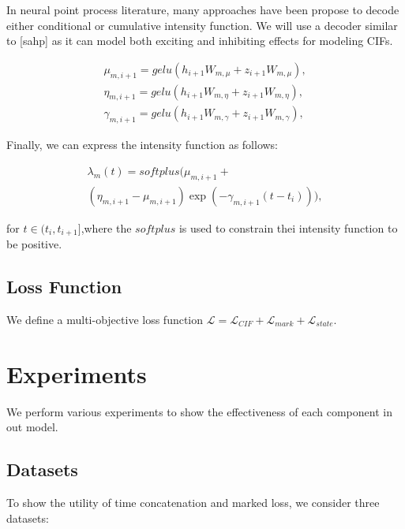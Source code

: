 \documentclass[journal,twoside,web]{ieeecolor}
\begin{document}
In neural point process literature, many approaches have been propose to decode either conditional or cumulative intensity function. We will use a decoder similar to [sahp] as it can model both exciting and inhibiting effects for modeling CIFs.


\begin{gather*} 
    \mu_{m,i+1}=gelu(h_{i+1}W_{m,\mu}  +  z_{i+1}W_{m,\mu}), \\ 
    \eta_{m,i+1}=gelu(h_{i+1}W_{m,\eta}  +  z_{i+1}W_{m,\eta}), \\
    \gamma_{m,i+1}=gelu(h_{i+1}W_{m,\gamma}  +  z_{i+1}W_{m,\gamma}),
    \end{gather*}

Finally, we can express the intensity function as follows:

\begin{multline*}
    \lambda_m(t)=softplus(\mu_{m,i+1}+\\
    (\eta_{m,i+1}- \mu_{m,i+1}) \exp(-\gamma_{m,i+1}(t-t_i))    ),
\end{multline*}

for $t \in (t_i, t_{i+1}]$,where the $softplus$ is used to constrain thei intensity function to be positive.


\subsection{Loss Function}

We define a multi-objective loss function 
$ \mathcal{L}   =   \mathcal{L}_{CIF}   +   \mathcal{L}_{mark}  +   \mathcal{L}_{state}$.





\section{Experiments}
\label{sec:Experiments}

We perform various experiments to show the effectiveness of each component in out model.
\subsection*{Datasets}


To show the utility of time concatenation and marked loss, we consider three datasets:
\end{document}
